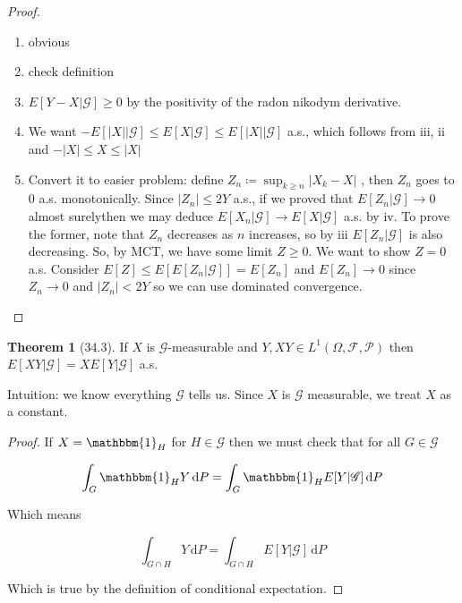 \documentclass{article}
\theoremstyle{definition}
\newtheorem{theorem}{Theorem}
\begin{document}
\begin{proof}

    \begin{enumerate}
        \item obvious
        \item check definition
        \item \(E[Y-X|\mathscr{G}]\geq 0\) by the positivity of the radon nikodym derivative.
        \item We want \(-E[\vert X \vert | \mathscr{G}] \leq E[X|\mathscr{G}] \leq E[\vert X \vert | \mathscr{G}]\) a.s., which follows from iii, ii and \(- \vert X \vert \leq  X \leq \vert X \vert \) 
        \item Convert it to easier problem: define \(Z_n \coloneqq \sup_{k \geq n} \vert X_k - X \vert \) , then \(Z_n\) goes to \(0\) a.s. monotonically. Since \(\vert Z_n \vert \leq 2Y\) a.s., if we proved that \(E[Z_n|\mathscr{G}]\to 0\) almost surelythen we may deduce \(E[X_n | \mathscr{G}] \to E[X|\mathscr{G}]\) a.s. by iv. To prove the former, note that \(Z_n\) decreases as \(n\) increases, so by iii \(E[Z_n|\mathscr{G}]\) is also decreasing. So, by MCT, we have some limit \(Z\geq 0\). We want to show \(Z = 0\) a.s. Consider \(E[Z]\leq E[E[Z_n|\mathscr{G}]]=E[Z_n]\) and \(E[Z_n]\to 0\) since \(Z_n \to 0\) and \(\vert Z_n \vert < 2Y\) so we can use dominated convergence.
            
    \end{enumerate}

\end{proof}

\begin{theorem}
    [34.3]

    If \(X\) is \(\mathscr{G}\)-measurable and \(Y,XY\in L^1(\Omega ,\mathscr{F} ,\mathscr{P})\) then \(E[XY|\mathscr{G}] = X E[Y|\mathscr{G}]\) a.s.
\end{theorem}

Intuition: we know everything \(\mathscr{G}\) tells us. Since \(X\) is \(\mathscr{G} \) measurable, we treat \(X\) as a constant.

\begin{proof}
    If \(X = \mathbbm{1}_{H} \) for \(H\in \mathscr{G}\) then we must check that for all \(G\in \mathscr{G}\) 
    
    \[
        \int_{G}^{} \mathbbm{1}_{H} Y \,\mathrm{d}P = \int_{G}^{} \mathbbm{1}_{H} E[Y|\mathscr{G}] \,\mathrm{d}P 
    \]

    Which means

    \[
        \int_{G\cap H}^{} Y \,\mathrm{d}P = \int_{G\cap H}^{} E[Y|\mathscr{G}] \,\mathrm{d}P 
    \]

    Which is true by the definition of conditional expectation.

\end{proof}
\end{document}
